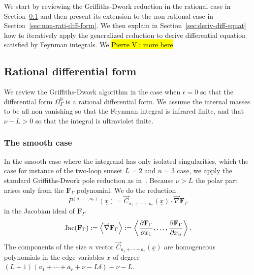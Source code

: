 \documentclass[a4paper,12pt]{article}
\numberwithin{equation}{section}
\numberwithin{figure}{section}
\newcommand{\pvnote}[1]{\sethlcolor{bubblegum} \protect\hl{Pierre V.: #1} \sethlcolor{yellow}}
\begin{document}
  We start by reviewing the Griffiths-Dwork reduction in the rational
  case in Section~\ref{sec:rati-diff-form} and then present its extension to
  the non-rational case in Section~\ref{sec:non-rati-diff-form}. We
  then explain in Section~\ref{sec:deriv-diff-equat} how to iteratively apply the generalized reduction to
  derive differential equation satisfied by Feynman integrals. We
  \pvnote{more here}
\subsection{Rational differential form}
\label{sec:rati-diff-form}

We review the Griffiths-Dwork algorithm in the case  
when $\epsilon=0$ so that the differential form
$\Omega^0_\Gamma$ is a rational differential form. We assume the
internal masses to be all non vanishing so that the Feynman
integral is infrared finite, and that $\nu -L>0$ so that the integral
is ultraviolet finite.
\subsubsection{The smooth case}
\label{sec:smooth-case}


 In the smooth case where the integrand has only isolated singularities, which the case for instance of  the two-loop
 sunset $L=2$ and $n=3$ case,  we apply the standard Griffiths-Dwork
 pole reduction as in~\cite{Bloch:2016izu}. Because  $\nu>L$ the polar part arises
 only from the $\textbf{F}_\Gamma$ polynomial. 
 We  do the reduction 
\begin{equation}\label{e:GD}
 P^{(a_1,\dots,a_r)}(\underline x) = \vec C_{a_1+\cdots+a_r}(\underline x)\cdot
   \vec\nabla   \textbf{F}_\Gamma
 \end{equation}
 in the Jacobian ideal of $ \textbf{F}_\Gamma$
 \begin{equation}
   \textrm{Jac}(   \textbf{F}_\Gamma) :=\left\langle\vec\nabla  \textbf{F}_\Gamma \right\rangle :=\left\langle{\partial
       \textbf{F}_\Gamma\over\partial x_1},\dots,  {\partial
       \textbf{F}_\Gamma\over\partial x_n}\right\rangle.
 \end{equation}
The components of the size $n$ vector $ \vec C_{a_1+\cdots+a_r}(\underline x)$ are homogeneous polynomials in the
     edge variables $\underline x$ of degree
     $(L+1)(a_1+\cdots+a_r+\nu-L\delta)-\nu-L$. 
\end{document}
